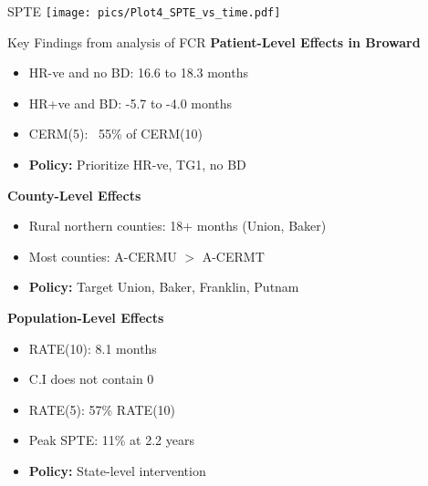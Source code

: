 \documentclass{beamer}
\begin{document}
\begin{frame}{SPTE}
\texttt{[image: pics/Plot4\_SPTE\_vs\_time.pdf]}
    
\end{frame}
\begin{frame}{Key Findings from analysis of FCR}
\textbf{Patient-Level Effects in Broward}
\begin{itemize}
\item HR-ve and no BD: 16.6 to 18.3 months 
\item HR+ve and BD: -5.7 to -4.0 months 
\item CERM(5): ~55\% of CERM(10)
\item \textbf{Policy:} Prioritize HR-ve, TG1, no BD
\end{itemize}
\pause
\textbf{County-Level Effects}
\begin{itemize}
\item Rural northern counties: 18+ months (Union, Baker)
\item Most counties: A-CERMU $>$ A-CERMT
\item \textbf{Policy:} Target Union, Baker, Franklin, Putnam
\end{itemize}
\pause
\textbf{Population-Level Effects}
\begin{itemize}
\item RATE(10): 8.1 months
\item C.I does not contain 0
\item RATE(5): 57\% RATE(10)
\item Peak SPTE: 11\% at 2.2 years
\item \textbf{Policy:} State-level intervention
\end{itemize}
\end{frame}
\end{document}
